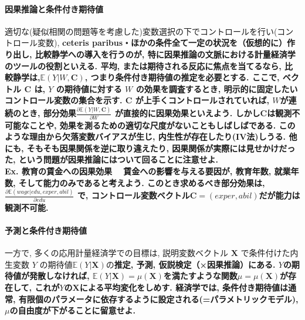 \documentclass[paper=a4paper,fontsize=10pt]{jlreq}
\begin{document}
\paragraph{因果推論と条件付き期待値}
適切な(疑似相関の問題等を考慮した)変数選択の下でコントロールを行い(\rightarrow コントロール変数), \rmfamily\mcfamily\bfseries{ceteris paribus・ほかの条件全て一定}\mdseries の状況を（仮想的に）作り出し, \rmfamily\mcfamily\bfseries{比較静学}\mdseries への導入を行うのが, 特に因果推論の文脈における計量経済学のツールの役割といえる. 平均, または期待される反応に焦点を当てるなら, 比較静学は,$\mathbb{E}(Y|W, \mathbf{C})$, つまり条件付き期待値の推定を必要とする. ここで, ベクトル $\mathbf{C}$ は, $Y$ の期待値に対する $W$ の効果を調査するとき, 明示的に\rmfamily\mcfamily\bfseries{固定したいコントロール変数の集合}\mdseries を示す. $\mathbf{C}$ が上手くコントロールされていれば, $W$が連続のとき, \rmfamily\mcfamily\bfseries{部分効果}\mdseries $\frac{\partial \mathbb{E}(Y|W, \mathbf{C})}{\partial W}$ が直接的に因果効果といえよう. しかし$\mathbf{C}$は観測不可能なことや, 効果を測るための適切な尺度がないこともしばしばである. このような理由から欠落変数バイアスが生じ, 内生性が存在したり(\rightarrow IV法)しうる. 他にも, そもそも因果関係を逆に取り違えたり, 因果関係が実際には見せかけだった, という問題が因果推論にはついて回ることに注意せよ.\\

\rmfamily\mcfamily\bfseries{Ex. 教育の賃金への因果効果}\mdseries　
賃金への影響を与える要因が, 教育年数, 就業年数, そして能力のみであると考えよう. このとき求めるべき部分効果は, $\frac{\partial \mathbb{E}(wage|edu, exper, abil)}{\partial edu}$ で, コントロール変数ベクトル$\mathbf{C}=(exper, abil)$だが能力は\rmfamily\mcfamily\bfseries{観測不可能}\mdseries . \\

\paragraph{予測と条件付き期待値}
一方で, 多くの応用計量経済学での目標は, 説明変数ベクトル $\mathbf{X}$ で条件付けた内生変数 $Y$ の期待値$\mathbb{E}(Y|\mathbf{X})$の\rmfamily\mcfamily\bfseries{推定, 予測, 仮説検定（×因果推論）}\mdseries にある. $Y$の期待値が発散しなければ, $\mathbb{E}(Y|\mathbf{X})=\mu(\mathbf{X})$を満たすような関数$\mu=\mu(\mathbf{X})$が存在して, これが$Y$の$\mathbf{X}$による平均変化をしめす. 経済学では, 条件付き期待値は通常, 有限個のパラメータに依存するように設定される(=\rmfamily\mcfamily\bfseries{パラメトリックモデル}\mdseries ), $\mu$の自由度が下がることに留意せよ.\\
\end{document}
